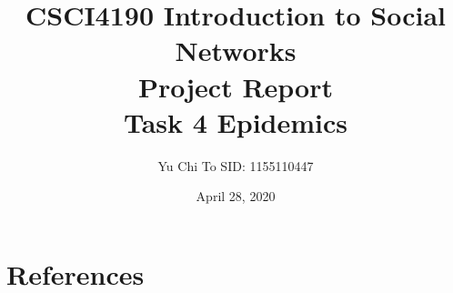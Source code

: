 \documentclass[a4paper]{article}
\title{CSCI4190 Introduction to Social Networks\\Project Report\\Task 4 Epidemics}
\author{Yu Chi To SID: 1155110447}
\date{April 28, 2020}
\begin{document}
  \maketitle
  \newpage
  
  \newpage
  \tableofcontents
  \newpage
  \listoffigures
  \newpage

  

  

  

  \newpage
  
  \FloatBarrier

  \nocite{easley_kleinberg_2019}

  \newpage
  \section{References}
  \printbibliography[heading=none]
\end{document}
